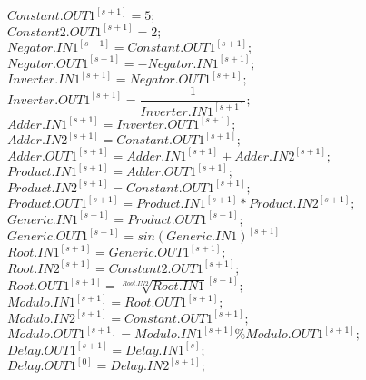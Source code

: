 \documentclass{article}
\begin{document}
\(Constant.OUT1^{[s+1]} = 5;\)\\
\(Constant2.OUT1^{[s+1]} = 2;\)\\
\(Negator.IN1^{[s+1]} = Constant.OUT1^{[s+1]};\)\\
\(Negator.OUT1^{[s+1]} = -Negator.IN1^{[s+1]};\)\\
\(Inverter.IN1^{[s+1]} = Negator.OUT1^{[s+1]};\)\\
\(Inverter.OUT1^{[s+1]} = \dfrac{1}{Inverter.IN1^{[s+1]}};\)\\
\(Adder.IN1^{[s+1]} = Inverter.OUT1^{[s+1]};\)\\
\(Adder.IN2^{[s+1]} = Constant.OUT1^{[s+1]};\)\\
\(Adder.OUT1^{[s+1]} = Adder.IN1^{[s+1]} + Adder.IN2^{[s+1]};\)\\
\(Product.IN1^{[s+1]} = Adder.OUT1^{[s+1]};\)\\
\(Product.IN2^{[s+1]} = Constant.OUT1^{[s+1]};\)\\
\(Product.OUT1^{[s+1]} = Product.IN1^{[s+1]} * Product.IN2^{[s+1]};\)\\
\(Generic.IN1^{[s+1]} = Product.OUT1^{[s+1]};\)\\
\(Generic.OUT1^{[s+1]} = sin(Generic.IN1)^{[s+1]}\)\\
\(Root.IN1^{[s+1]} = Generic.OUT1^{[s+1]};\)\\
\(Root.IN2^{[s+1]} = Constant2.OUT1^{[s+1]};\)\\
\(Root.OUT1^{[s+1]} = \sqrt[Root.IN2]{Root.IN1}^{[s+1]};\)\\
\(Modulo.IN1^{[s+1]} = Root.OUT1^{[s+1]};\)\\
\(Modulo.IN2^{[s+1]} = Constant.OUT1^{[s+1]};\)\\
\(Modulo.OUT1^{[s+1]} = Modulo.IN1^{[s+1]} \% Modulo.OUT1^{[s+1]};\)\\
\(Delay.OUT1^{[s+1]} = Delay.IN1^{[s]};\)\\
\(Delay.OUT1^{[0]} = Delay.IN2^{[s+1]};\)\\
\end{document}
